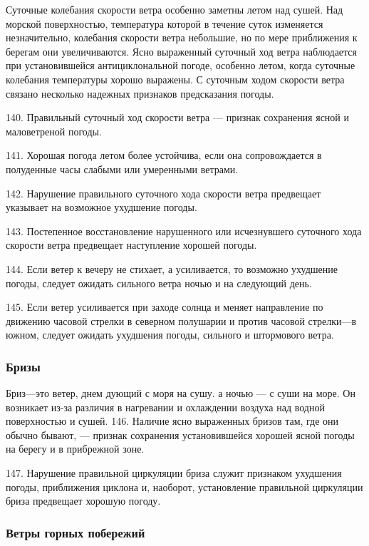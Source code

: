 Суточные колебания скорости ветра особенно заметны летом над сушей. Над морской поверхностью, температура которой в течение суток изменяется незначительно, колебания скорости ветра небольшие, но по мере приближения к берегам они увеличиваются. Ясно выраженный суточный ход ветра наблюдается при установившейся антициклональной погоде, особенно летом, когда суточные колебания температуры хорошо выражены. С суточным ходом скорости ветра связано несколько надежных признаков предсказания погоды.

140. Правильный суточный ход скорости ветра — признак сохранения ясной и маловетреной погоды.

141. Хорошая погода летом более устойчива, если она сопровождается в полуденные часы слабыми или умеренными ветрами.

142. Нарушение правильного суточного хода скорости ветра предвещает указывает на возможное ухудшение погоды.

143. Постепенное восстановление нарушенного или исчезнувшего суточного хода скорости ветра предвещает наступление хорошей погоды.

144. Если ветер к вечеру не стихает, а усиливается, то возможно ухудшение погоды, следует ожидать сильного ветра ночью и на следующий день.

145. Если ветер усиливается при заходе солнца и меняет направление по движению часовой стрелки в северном полушарии и против часовой стрелки—в южном, следует ожидать ухудшения погоды, сильного и штормового ветра.

\subsubsection{Бризы}

Бриз—это ветер, днем дующий с моря на сушу. а ночью — с суши на море. Он возникает из-за различия в нагревании и охлаждении воздуха над водной поверхностью и сушей.
146. Наличие ясно выраженных бризов там, где они обычно бывают, — признак сохранения установившейся хорошей ясной погоды на берегу и в прибрежной зоне.

147. Нарушение правильной циркуляции бриза служит признаком ухудшения погоды, приближения циклона и, наоборот, установление правильной циркуляции бриза предвещает хорошую погоду.

\subsubsection{Ветры горных побережий}

